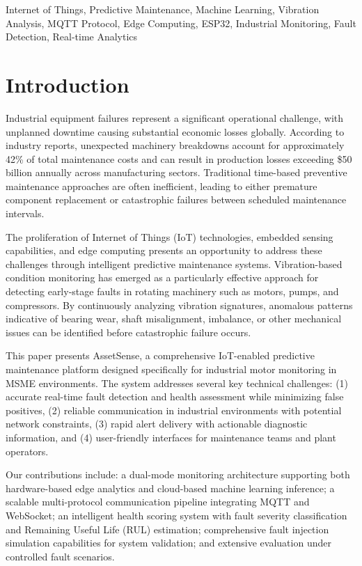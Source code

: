 \documentclass[conference]{IEEEtran}
\begin{document}
\begin{IEEEkeywords}
Internet of Things, Predictive Maintenance, Machine Learning, Vibration Analysis, MQTT Protocol, Edge Computing, ESP32, Industrial Monitoring, Fault Detection, Real-time Analytics
\end{IEEEkeywords}

\section{Introduction}
Industrial equipment failures represent a significant operational challenge, with unplanned downtime causing substantial economic losses globally. According to industry reports, unexpected machinery breakdowns account for approximately 42\% of total maintenance costs and can result in production losses exceeding \$50 billion annually across manufacturing sectors. Traditional time-based preventive maintenance approaches are often inefficient, leading to either premature component replacement or catastrophic failures between scheduled maintenance intervals.

The proliferation of Internet of Things (IoT) technologies, embedded sensing capabilities, and edge computing presents an opportunity to address these challenges through intelligent predictive maintenance systems. Vibration-based condition monitoring has emerged as a particularly effective approach for detecting early-stage faults in rotating machinery such as motors, pumps, and compressors. By continuously analyzing vibration signatures, anomalous patterns indicative of bearing wear, shaft misalignment, imbalance, or other mechanical issues can be identified before catastrophic failure occurs.

This paper presents AssetSense, a comprehensive IoT-enabled predictive maintenance platform designed specifically for industrial motor monitoring in MSME environments. The system addresses several key technical challenges: (1) accurate real-time fault detection and health assessment while minimizing false positives, (2) reliable communication in industrial environments with potential network constraints, (3) rapid alert delivery with actionable diagnostic information, and (4) user-friendly interfaces for maintenance teams and plant operators.

Our contributions include: a dual-mode monitoring architecture supporting both hardware-based edge analytics and cloud-based machine learning inference; a scalable multi-protocol communication pipeline integrating MQTT and WebSocket; an intelligent health scoring system with fault severity classification and Remaining Useful Life (RUL) estimation; comprehensive fault injection simulation capabilities for system validation; and extensive evaluation under controlled fault scenarios.
\end{document}
